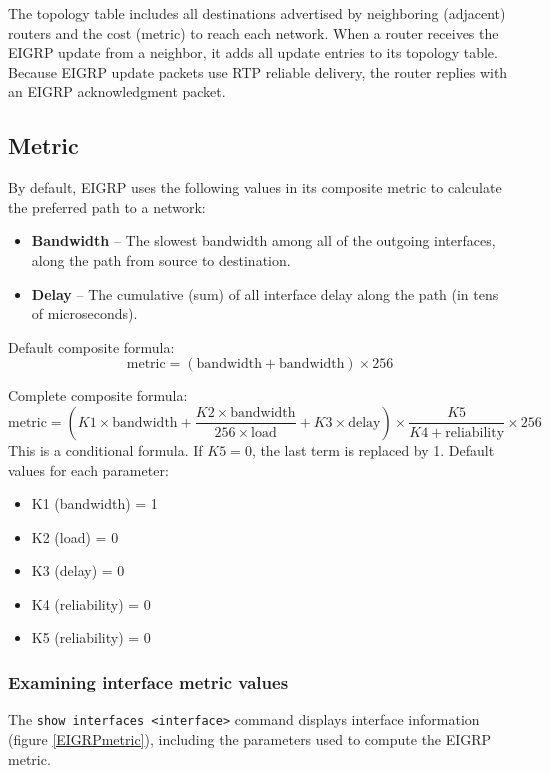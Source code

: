 The topology table includes all destinations advertised by neighboring (adjacent) routers and the cost (metric) to reach each network. When a router receives the EIGRP update from a neighbor, it adds all update entries to its topology table. Because EIGRP update packets use RTP reliable delivery, the router replies with an EIGRP acknowledgment packet.

\subsection{Metric}

By default, EIGRP uses the following values in its composite metric to calculate the preferred path to a network:

\begin{itemize}
\item \textbf{Bandwidth} -- The slowest bandwidth among all of the outgoing interfaces, along the path from source to destination.
\item \textbf{Delay} -- The cumulative (sum) of all interface delay along the path (in tens of microseconds).
\end{itemize}

Default composite formula:
\[ \text{metric} = \left( \text{bandwidth} + \text{bandwidth} \right) \times 256 \]

Complete composite formula:
\[ \text{metric} = \left( K1\times\text{bandwidth} + \frac{K2\times\text{bandwidth}}{256\times\text{load}} + K3\times\text{delay} \right) \times \frac{K5}{K4+\text{reliability}} \times 256 \]
This is a conditional formula. If $K5=0$, the last term is replaced by 1. Default values for each parameter:

\begin{itemize}
\item K1 (bandwidth) = 1
\item K2 (load) = 0
\item K3 (delay) = 0
\item K4 (reliability) = 0
\item K5 (reliability) = 0
\end{itemize}

\subsubsection{Examining interface metric values}

The \verb|show interfaces <interface>| command displays interface information (figure \ref{EIGRPmetric}), including the parameters used to compute the EIGRP metric.

